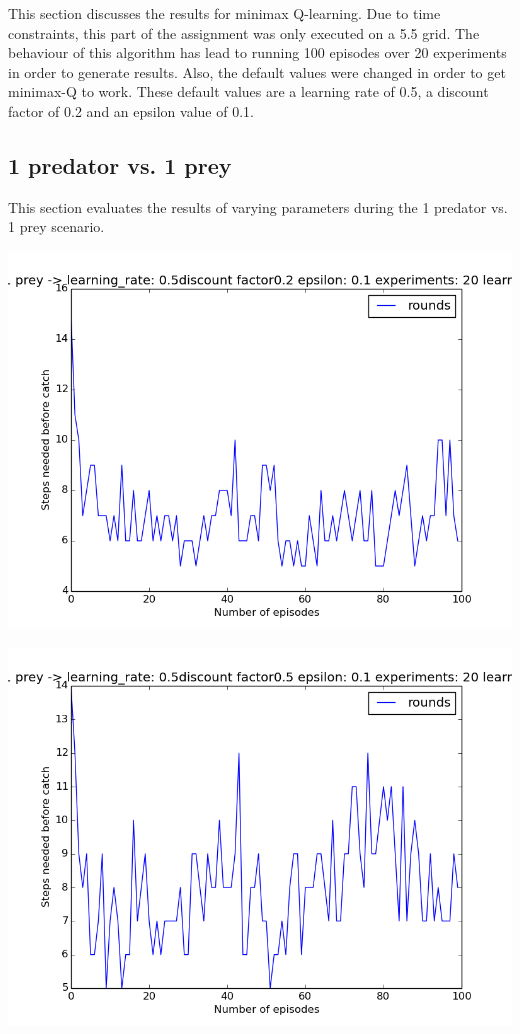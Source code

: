 This section discusses the results for minimax Q-learning. Due to time constraints, this part of the assignment was only executed on a 5.5 grid. The behaviour of this algorithm has lead to running 100 episodes over 20 experiments in order to generate results. Also, the default values were changed in order to get minimax-Q to work. These default values are a learning rate of 0.5, a discount factor of 0.2 and an epsilon value of 0.1.

\subsection{1 predator vs. 1 prey}
This section evaluates the results of varying parameters during the 1 predator vs. 1 prey scenario.
\begin{center}
	\includegraphics[scale=0.3]{minimax_100rounds_20exp_disc02_alpha05}
	\label{graph:1vs1_disc_02}
\end{center}

\begin{center}
	\includegraphics[scale=0.3]{minimax_100rounds_20exp_disc05_alpha05}
	\label{graph:1vs1_disc_05}
\end{center}

